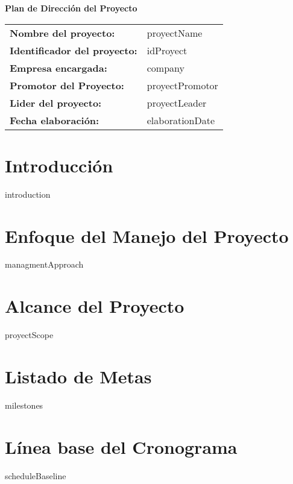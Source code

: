 \documentclass{article}
\begin{document}
\begin{center}
{\huge\textbf{Plan de Dirección del Proyecto}}\\[14cm]
\end{center}

\vspace{0.5cm}

\newcommand{\wrappingmulticolumn}[3] 
    {\multicolumn{#1}
                 {|>{\hsize=\dimexpr#1\hsize+\tabcolsep * (2 * (#1 - 1) )+\arrayrulewidth* (#1 - 2)\relax}#2|}
                 {#3}}
\renewcommand{\arraystretch}{1.5} %


\begin{tabular}{|ll|} \hline
\rowcolor{gray!10}\textbf{Nombre del proyecto:} & {{proyectName}} \\[0.3cm]
\textbf{Identificador del proyecto:} & {{idProyect}} \\[0.3cm]
\textbf{Empresa encargada:} & {{company}} \\[0.3cm]
\textbf{Promotor del Proyecto:} & {{proyectPromotor}} \\[0.3cm]
\textbf{Lider del proyecto:} & {{proyectLeader}} \\[0.3cm]
\textbf{Fecha elaboración:} & {{elaborationDate}} \\ \hline
\end{tabular}

\newpage

\tableofcontents
\newpage

\section{Introducción}
{{introduction}}
\section{Enfoque del Manejo del Proyecto}
{{managmentApproach}}
\section{Alcance del Proyecto}
{{proyectScope}}
\section{Listado de Metas}
{{milestones}}
\section{Línea base del Cronograma}
{{scheduleBaseline}}
\end{document}
